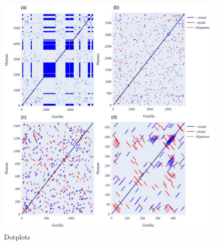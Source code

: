 \begin{figure}[htbp]
\centering
\includegraphics[width=\textwidth]{figures/diagrams/primate_dotplots.pdf}
\caption{Dotplots}
\label{fig:dotplots}
\end{figure}